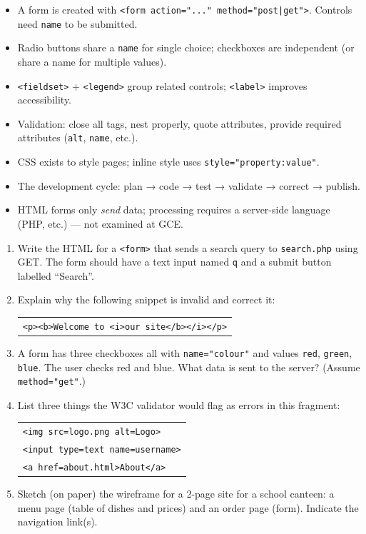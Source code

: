 \documentclass[11pt]{article}
\begin{document}
\begin{aretenir}
\begin{itemize}
  \item A form is created with \texttt{<form action="..." method="post|get">}.  Controls need \texttt{name} to be submitted.
  \item Radio buttons share a \texttt{name} for single choice; checkboxes are independent (or share a name for multiple values).
  \item \texttt{<fieldset>} + \texttt{<legend>} group related controls; \texttt{<label>} improves accessibility.
  \item Validation: close all tags, nest properly, quote attributes, provide required attributes (\texttt{alt}, \texttt{name}, etc.).
  \item CSS exists to style pages; inline style uses \texttt{style="property:value"}.
  \item The development cycle: plan → code → test → validate → correct → publish.
  \item HTML forms only \emph{send} data; processing requires a server-side language (PHP, etc.) — not examined at GCE.
\end{itemize}
\end{aretenir}

\begin{exercice}
\begin{enumerate}
  \item Write the HTML for a \texttt{<form>} that sends a search query to \texttt{search.php} using GET.  The form should have a text input named \texttt{q} and a submit button labelled “Search”.
  \item Explain why the following snippet is invalid and correct it:
  \begin{tabular}{@{}l@{}}
  \texttt{\textless p\textgreater\textless b\textgreater Welcome to \textless i\textgreater our site\textless/b\textgreater\textless/i\textgreater\textless/p\textgreater}
  \end{tabular}
  \item A form has three checkboxes all with \texttt{name="colour"} and values \texttt{red}, \texttt{green}, \texttt{blue}.  The user checks red and blue.  What data is sent to the server?  (Assume \texttt{method="get"}.)
  \item List three things the W3C validator would flag as errors in this fragment:
  \begin{tabular}{@{}l@{}}
  \texttt{\textless img src=logo.png alt=Logo\textgreater} \\
  \texttt{\textless input type=text name=username\textgreater} \\
  \texttt{\textless a href=about.html\textgreater About\textless/a\textgreater}
  \end{tabular}
  \item Sketch (on paper) the wireframe for a 2-page site for a school canteen: a menu page (table of dishes and prices) and an order page (form).  Indicate the navigation link(s).
\end{enumerate}
\end{exercice}
\end{document}
